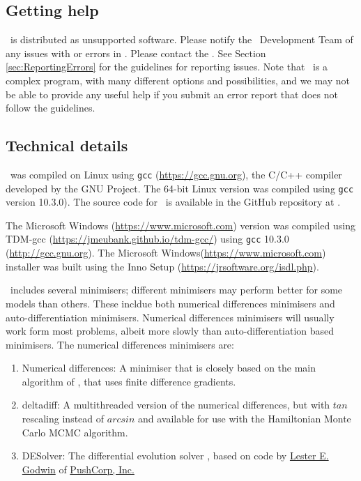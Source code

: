 \subsection{Getting help}

\CNAME\ is distributed as unsupported software. Please notify the \CNAME\ Development Team of any issues with or errors in \CNAME. Please contact the \emaillink. See Section \ref{sec:ReportingErrors} for the guidelines for reporting issues. Note that \CNAME\ is a complex program, with many different options and possibilities, and we may not be able to provide any useful help if you submit an error report that does not follow the guidelines.

\subsection{Technical details}\label{sec:TechnicalDetails}

\CNAME\ was compiled on Linux using \texttt{gcc} (\url{https://gcc.gnu.org}), the C/C++ compiler developed by the GNU Project. The 64-bit Linux  version was compiled using \texttt{gcc} version 10.3.0). The source code for \CNAME\ is available in the GitHub repository at \github.

The Microsoft Windows (\url{https://www.microsoft.com}) version was compiled using TDM-gcc (\url{https://jmeubank.github.io/tdm-gcc/}) using \texttt{gcc} 10.3.0 (\url{http://gcc.gnu.org}). The Microsoft Windows(\url{https://www.microsoft.com}) installer was built using the Inno Setup (\url{https://jrsoftware.org/isdl.php}).

\CNAME\ includes several minimisers; different minimisers may perform better for some models than others. These incldue both numerical differences minimisers and auto-differentiation minimisers. Numerical differences minimisers will usually work form most problems, albeit more slowly than auto-differentiation based minimisers. The numerical differences minimisers are:

\begin{enumerate}
\item Numerical differences: A minimiser that is closely based on the main algorithm of \cite{779}, that uses finite difference gradients.
\item deltadiff: A multithreaded version of the numerical differences, but with $tan$ rescaling instead of $arcsin$ and available for use with the Hamiltonian Monte Carlo MCMC algorithm.
\item DESolver: The differential evolution solver \citep{1442}, based on code by \href{mailto:<godwin@pushcorp.com>}{Lester E. Godwin} of \href{http://www.pushcorp.com}{PushCorp, Inc.}
\end{enumerate}

